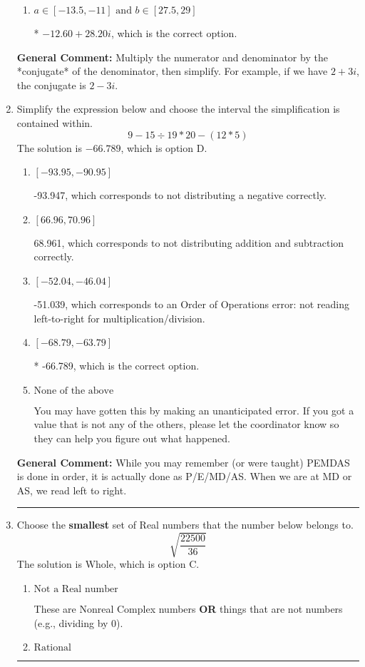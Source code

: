 \documentclass{extbook}[14pt]
\newcommand{\litem}[1]{\item #1

\rule{\textwidth}{0.4pt}}
\begin{document}
\begin{enumerate}
{\begin{enumerate}[label=\Alph*.]
 $72.00  - 22.00 i$, which corresponds to just dividing the first term by the first term and the second by the second.
\item \( a \in [-13.5, -11] \text{ and } b \in [27.5, 29] \)

* $-12.60  + 28.20 i$, which is the correct option.
\end{enumerate}

\textbf{General Comment:} Multiply the numerator and denominator by the *conjugate* of the denominator, then simplify. For example, if we have $2+3i$, the conjugate is $2-3i$.
}
\litem{
Simplify the expression below and choose the interval the simplification is contained within.
\[ 9 - 15 \div 19 * 20 - (12 * 5) \]
The solution is \( -66.789 \), which is option D.\begin{enumerate}[label=\Alph*.]
\item \( [-93.95, -90.95] \)

 -93.947, which corresponds to not distributing a negative correctly.
\item \( [66.96, 70.96] \)

 68.961, which corresponds to not distributing addition and subtraction correctly.
\item \( [-52.04, -46.04] \)

 -51.039, which corresponds to an Order of Operations error: not reading left-to-right for multiplication/division.
\item \( [-68.79, -63.79] \)

* -66.789, which is the correct option.
\item \( \text{None of the above} \)

 You may have gotten this by making an unanticipated error. If you got a value that is not any of the others, please let the coordinator know so they can help you figure out what happened.
\end{enumerate}

\textbf{General Comment:} While you may remember (or were taught) PEMDAS is done in order, it is actually done as P/E/MD/AS. When we are at MD or AS, we read left to right.
}
\litem{
Choose the \textbf{smallest} set of Real numbers that the number below belongs to.
\[ \sqrt{\frac{22500}{36}} \]
The solution is \( \text{Whole} \), which is option C.\begin{enumerate}[label=\Alph*.]
\item \( \text{Not a Real number} \)

These are Nonreal Complex numbers \textbf{OR} things that are not numbers (e.g., dividing by 0).
\item \( \text{Rational} \)


\end{enumerate}}
\end{enumerate}
\end{document}
